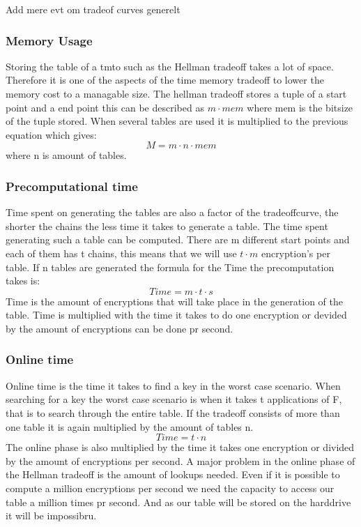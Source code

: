Add mere evt om tradeof curves generelt
\subsubsection{Memory Usage}
Storing the table of a tmto such as the Hellman tradeoff takes a lot of space. Therefore it is one of the aspects of the time memory tradeoff to lower the memory cost to a managable size. The hellman tradeoff stores a tuple of a start point and a end point this can be described as $m\cdot mem$ where mem is the bitsize of the  tuple stored. When several tables are used it is multiplied to the previous equation which gives:
\begin{equation}
M=m\cdot n\cdot mem
\end{equation}
where n is amount of tables.
\subsubsection{Precomputational time}
Time spent on generating the tables are also a factor of the tradeoffcurve, the shorter the chains the less time it takes to generate a table. The time spent generating such a table can be computed. There are m different start points and each of them has t chains, this means that we will use $t\cdot m$ encryption's per table. If n tables are generated the formula for the Time the precomputation takes is:
\begin{equation}
  Time=m\cdot t\cdot s
\end{equation}
Time is the amount of encryptions that will take place in the generation of the table. Time is multiplied with the time it takes to do one encryption or devided by the amount of encryptions can be done pr second.

\subsubsection{Online time}
Online time is the time it takes to find a key in the worst case scenario. When searching for a key the worst case scenario is when it takes t applications of F, that is to search through the entire table. If the tradeoff consists of more than one table it is again multiplied by the amount of tables n.
\begin{equation}
  Time=t\cdot n
\end{equation}
The online phase is also multiplied by the time it takes one encryption or divided by the amount of encryptions per second. A major problem in the online phase of the  Hellman tradeoff is the amount of lookups needed. Even if it is possible to compute a million encryptions per second we need the capacity to access our table a million times pr second. And as our table will be stored on the harddrive it will be impossibru.



